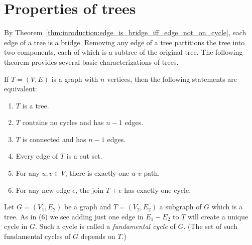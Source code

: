 
\section{Properties of trees}

By Theorem~\ref{thm:inroduction:edge_is_bridge_iff_edge_not_on_cycle},
each edge of a tree is a bridge. Removing any edge of a tree
partitions the tree into two components, each of which is a subtree of
the original tree. The following theorem provides several basic
characterizations of trees.

\begin{theorem}
If $T = (V, E)$ is a graph with $n$ vertices, then the following
statements are equivalent:
\begin{enumerate}
\item $T$ is a tree.

\item $T$ contains no cycles and has $n - 1$ edges.

\item $T$ is connected and has $n - 1$ edges.

\item Every edge of $T$ is a cut set.

\item For any $u,v \in V$, there is exactly one $u$-$v$ path.

\item For any new edge $e$, the join $T + e$ has exactly one cycle.
\end{enumerate}
\end{theorem}

Let $G=(V_1,E_2)$ be a graph and $T=(V_2,E_2)$ a subgraph of $G$ which is a tree.
As in (6) we see adding just one edge in $E_1-E_2$ to $T$ will create a
unique cycle in $G$. Such a cycle is called a {\it fundamental cycle}
of $G$. (The set of such fundamental cycles of $G$ depends on $T$.)

